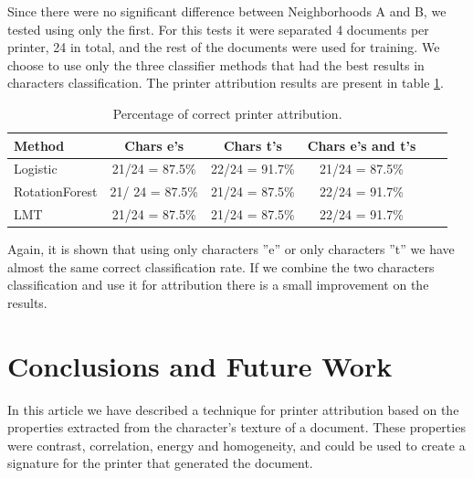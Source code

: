 \documentclass[10pt,twocolumn,letterpaper]{article}
\begin{document}
Since there were no significant difference between Neighborhoods A and B, we tested using only the first. For this tests it were separated 4 documents per printer, 24 in total, and the rest of the documents were used for training. We choose to use only the three classifier methods that had the best results in characters classification. The printer attribution results are present in table \ref{tab:correct_printer_attribution}.

\begin{table}
\caption{Percentage of correct printer attribution.}
\label{tab:correct_printer_attribution}
\begin{center}
\begin{small} 
\setlength{\tabcolsep}{3pt} 
\begin{tabular}{l*{4}{c}r} \cline{1-4}
Method & Chars e’s & Chars t’s & Chars e’s and t’s \\
\hline
Logistic & 21/24 = 87.5\% & 22/24 = 91.7\% & 21/24 = 87.5\% \\

RotationForest & 21/ 24 = 87.5\% & 21/24 = 87.5\% & 22/24 = 91.7\% \\

LMT & 21/24 = 87.5\% & 21/24 = 87.5\% & 22/24 = 91.7\% \\

\end{tabular}
\end{small}
\end{center}
\end{table}

Again, it is shown that using only characters ''e'' or only characters ''t'' we have almost the same correct classification rate. If we combine the two characters classification and use it for attribution there is a small improvement on the results.

\section{Conclusions and Future Work}
\label{sec:conclusions}

In this article we have described a technique for printer attribution based on the properties extracted from the character’s texture of a document. These properties were contrast, correlation, energy and homogeneity, and could be used to create a signature for the printer that generated the document. 
\end{document}

